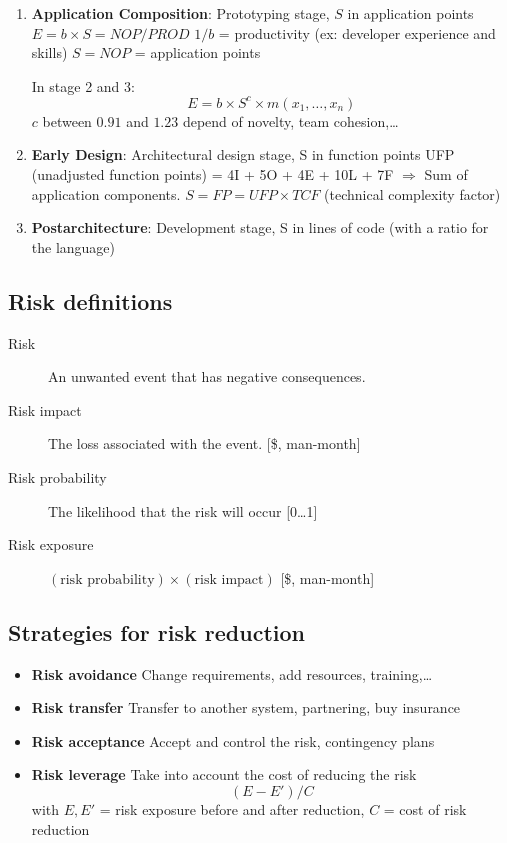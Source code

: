 \begin{enumerate}
    \item \textbf{Application Composition}: Prototyping stage, \textcolor{red!80!black}{$S$ in application points}
        \subitem{} $E = b \times S = NOP / PROD$
        \subitem{} $1 / b$ = productivity (ex: developer experience and skills)
        \subitem{} $S = NOP$ = application points

    \begin{framed}
        In stage 2 and 3:
        $$E = b \times S^{c} \times m({x}_{1},\ldots, {x}_{n})$$
        $c$ between $0.91$ and $1.23$ depend of novelty, team cohesion,\ldots
    \end{framed}
    \item \textbf{Early Design}: Architectural design stage, \textcolor{red!80!black}{S in function points}
        \subitem{} UFP (unadjusted function points) = 4I + 5O + 4E + 10L
        + 7F $\Rightarrow$   Sum of application components.
        \subitem{} $S = FP = UFP \times TCF$ (technical complexity factor)

    \item \textbf{Postarchitecture}: Development stage,
        \textcolor{red!80!black}{S in lines of code} (with a ratio for
        the language)
\end{enumerate}

\subsection{Risk definitions}

\begin{description}
    \item[Risk] An unwanted event that has negative consequences.
    \item[Risk impact] The loss associated with the event. [\$, man-month]
    \item[Risk probability] The likelihood that the risk will occur [0\ldots1]
    \item[Risk exposure] $(\textrm{risk probability}) \times (\textrm{risk impact})$ [\$, man-month]
\end{description}

\subsection{Strategies for risk reduction}

\begin{itemize}
    \item \textbf{Risk avoidance} Change requirements, add resources, training,\ldots
    \item \textbf{Risk transfer} Transfer to another system, partnering, buy insurance
    \item \textbf{Risk acceptance} Accept and control the risk, contingency plans
    \item \textbf{Risk leverage} Take into account the cost of reducing the risk
    $$(E - E')/C$$
with $E, E'$ = risk exposure before and after reduction,
$C$ = cost of risk reduction

\end{itemize}
